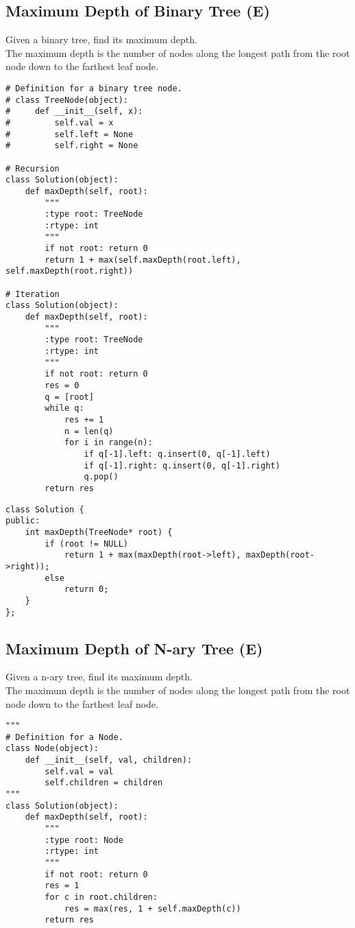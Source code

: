\subsection{Maximum Depth of Binary Tree (E)}
Given a binary tree, find its maximum depth.\\

The maximum depth is the number of nodes along the longest path from the root node down to the farthest leaf node.\\

\begin{lstlisting}
# Definition for a binary tree node.
# class TreeNode(object):
#     def __init__(self, x):
#         self.val = x
#         self.left = None
#         self.right = None

# Recursion
class Solution(object):
    def maxDepth(self, root):
        """
        :type root: TreeNode
        :rtype: int
        """
        if not root: return 0
        return 1 + max(self.maxDepth(root.left), self.maxDepth(root.right))
        
# Iteration
class Solution(object):
    def maxDepth(self, root):
        """
        :type root: TreeNode
        :rtype: int
        """
        if not root: return 0
        res = 0
        q = [root]
        while q:
            res += 1
            n = len(q)
            for i in range(n):
                if q[-1].left: q.insert(0, q[-1].left)
                if q[-1].right: q.insert(0, q[-1].right)
                q.pop()
        return res
\end{lstlisting}

\begin{lstlisting}
class Solution {
public:
    int maxDepth(TreeNode* root) {
        if (root != NULL)
            return 1 + max(maxDepth(root->left), maxDepth(root->right));
        else
            return 0;
    }
};
\end{lstlisting}

\subsection{Maximum Depth of N-ary Tree (E)}
Given a n-ary tree, find its maximum depth.\\

The maximum depth is the number of nodes along the longest path from the root node down to the farthest leaf node.\\

\begin{lstlisting}
"""
# Definition for a Node.
class Node(object):
    def __init__(self, val, children):
        self.val = val
        self.children = children
"""
class Solution(object):
    def maxDepth(self, root):
        """
        :type root: Node
        :rtype: int
        """
        if not root: return 0
        res = 1
        for c in root.children:
            res = max(res, 1 + self.maxDepth(c))
        return res
\end{lstlisting}

